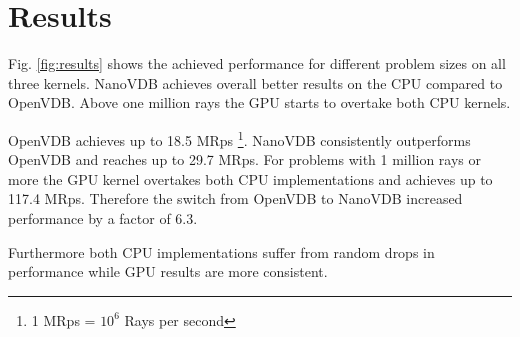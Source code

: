 \section{Results}

Fig. \ref{fig:results} shows the achieved performance for different problem sizes on all three kernels.
NanoVDB achieves overall better results on the CPU compared to OpenVDB.
Above one million rays the GPU starts to overtake both CPU kernels.

OpenVDB achieves up to 18.5 MRps \footnote{1 MRps = $10^6$ Rays per second}. NanoVDB consistently outperforms OpenVDB and reaches up to 29.7 MRps.
For problems with 1 million rays or more the GPU kernel overtakes both CPU implementations and achieves up to 117.4 MRps.
Therefore the switch from OpenVDB to NanoVDB increased performance by a factor of 6.3.

Furthermore both CPU implementations suffer from random drops in performance while GPU results are more consistent.


